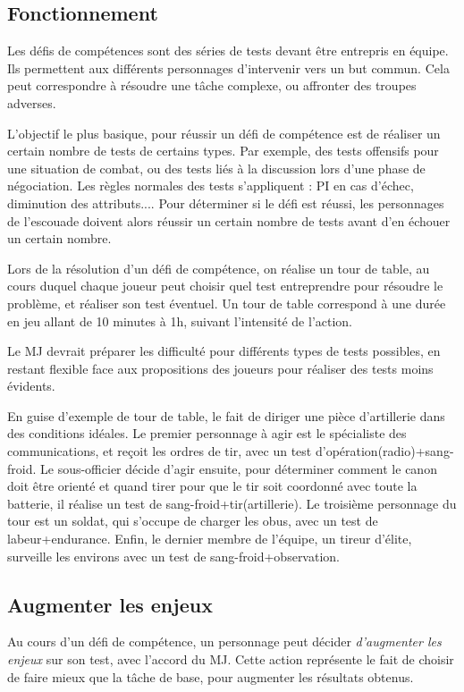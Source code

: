 \documentclass{report}
\begin{document}
\begin{multicols}{2}
\subsection{Fonctionnement}
Les défis de compétences sont des séries de tests devant être entrepris en équipe. Ils permettent aux différents personnages d'intervenir vers un but commun. Cela peut correspondre à résoudre une tâche complexe, ou affronter des troupes adverses.

L'objectif le plus basique, pour réussir un défi de compétence est de réaliser un certain nombre de tests de certains types. Par exemple, des tests offensifs pour une situation de combat, ou des tests liés à la discussion lors d'une phase de négociation. Les règles normales des tests s'appliquent : PI en cas d'échec, diminution des attributs.... Pour déterminer si le défi est réussi, les personnages de l'escouade doivent alors réussir un certain nombre de tests avant d'en échouer un certain nombre.

Lors de la résolution d'un défi de compétence, on réalise un tour de table, au cours duquel chaque joueur peut choisir quel test entreprendre pour résoudre le problème, et réaliser son test éventuel. Un tour de table correspond à une durée en jeu allant de 10 minutes à 1h, suivant l'intensité de l'action.

Le MJ devrait préparer les difficulté pour différents types de tests possibles, en restant flexible face aux propositions des joueurs pour réaliser des tests moins évidents.

En guise d'exemple de tour de table, le fait de diriger une pièce d'artillerie dans des conditions idéales. Le premier personnage à agir est le spécialiste des communications, et reçoit les ordres de tir, avec un test d'opération(radio)+sang-froid. Le sous-officier décide d'agir ensuite, pour déterminer comment le canon doit être orienté et quand tirer pour que le tir soit coordonné avec toute la batterie, il réalise un test de sang-froid+tir(artillerie). Le troisième personnage du tour est un soldat, qui s'occupe de charger les obus, avec un test de labeur+endurance. Enfin, le dernier membre de l'équipe, un tireur d'élite, surveille les environs avec un test de sang-froid+observation.
\subsection{Augmenter les enjeux}
Au cours d'un défi de compétence, un personnage peut décider \emph{d'augmenter les enjeux} sur son test, avec l'accord du MJ. Cette action représente le fait de choisir de faire mieux que la tâche de base, pour augmenter les résultats obtenus.


\end{multicols}
\end{document}
